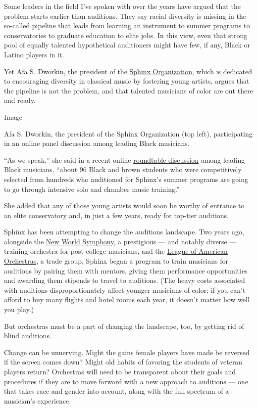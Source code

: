 Some leaders in the field I've spoken with over the years have argued
that the problem starts earlier than auditions. They say racial
diversity is missing in the so-called pipeline that leads from learning
an instrument to summer programs to conservatories to graduate education
to elite jobs. In this view, even that strong pool of equally talented
hypothetical auditioners might have few, if any, Black or Latino players
in it.

Yet Afa S. Dworkin, the president of the
\href{http://www.sphinxmusic.org/}{Sphinx Organization}, which is
dedicated to encouraging diversity in classical music by fostering young
artists, argues that the pipeline is not the problem, and that talented
musicians of color are out there and ready.

Image

Afa S. Dworkin, the president of the Sphinx Organization (top left),
participating in an online panel discussion among leading Black
musicians.

``As we speak,'' she said in a recent online
\href{https://www.facebook.com/watch/?v=693343974780937}{roundtable
discussion} among leading Black musicians, ``about 96 Black and brown
students who were competitively selected from hundreds who auditioned
for Sphinx's summer programs are going to go through intensive solo and
chamber music training.''

She added that any of those young artists would soon be worthy of
entrance to an elite conservatory and, in just a few years, ready for
top-tier auditions.

Sphinx has been attempting to change the auditions landscape. Two years
ago, alongside the \href{https://www.nws.edu/}{New World Symphony}, a
prestigious --- and notably diverse --- training orchestra for
post-college musicians, and the
\href{https://americanorchestras.org/}{League of American Orchestras}, a
trade group, Sphinx began a program to train musicians for auditions by
pairing them with mentors, giving them performance opportunities and
awarding them stipends to travel to auditions. (The heavy costs
associated with auditions disproportionately affect younger musicians of
color; if you can't afford to buy many flights and hotel rooms each
year, it doesn't matter how well you play.)

But orchestras must be a part of changing the landscape, too, by getting
rid of blind auditions.

Change can be unnerving. Might the gains female players have made be
reversed if the screen comes down? Might old habits of favoring the
students of veteran players return? Orchestras will need to be
transparent about their goals and procedures if they are to move forward
with a new approach to auditions --- one that takes race and gender into
account, along with the full spectrum of a musician's experience.

